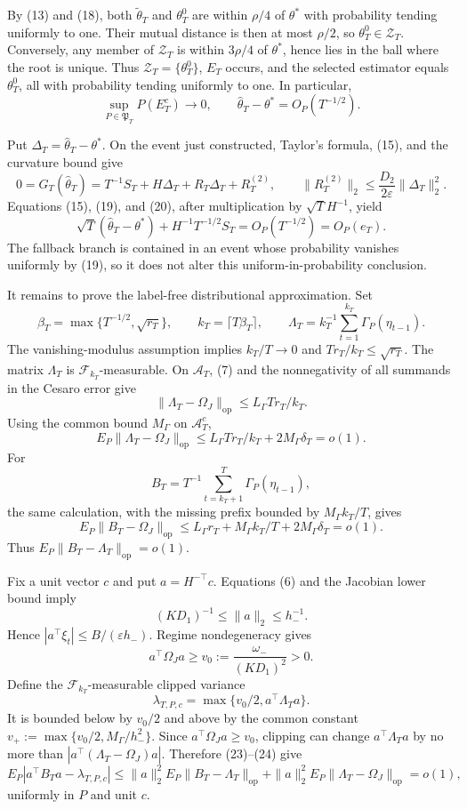 By (13) and (18), both \(\widetilde\theta_T\) and \(\theta_T^0\) are within \(\rho/4\) of \(\theta^*\) with probability tending uniformly to one. Their mutual distance is then at most \(\rho/2\), so \(\theta_T^0\in\mathcal Z_T\). Conversely, any member of \(\mathcal Z_T\) is within \(3\rho/4\) of \(\theta^*\), hence lies in the ball where the root is unique. Thus \(\mathcal Z_T=\{\theta_T^0\}\), \(E_T\) occurs, and the selected estimator equals \(\theta_T^0\), all with probability tending uniformly to one. In particular,
\[
 \sup_{P\in\mathfrak P_T}P(E_T^c)\longrightarrow0,
 \qquad \widehat\theta_T-\theta^*=O_P(T^{-1/2}). \tag{19}
\]

Put \(\Delta_T=\widehat\theta_T-\theta^*\). On the event just constructed, Taylor's formula, (15), and the curvature bound give
\[
 0=G_T(\widehat\theta_T)
 =T^{-1}S_T+H\Delta_T+R_T\Delta_T+R_T^{(2)},
 \qquad
 \|R_T^{(2)}\|_2\le\frac{D_2}{2\varepsilon}\|\Delta_T\|_2^2. \tag{20}
\]
Equations (15), (19), and (20), after multiplication by \(\sqrt T H^{-1}\), yield
\[
 \sqrt T(\widehat\theta_T-\theta^*)+H^{-1}T^{-1/2}S_T
 =O_P(T^{-1/2})=O_P(e_T). \tag{21}
\]
The fallback branch is contained in an event whose probability vanishes uniformly by (19), so it does not alter this uniform-in-probability conclusion.

It remains to prove the label-free distributional approximation. Set
\[
 \beta_T=\max\{T^{-1/2},\sqrt{r_T}\},
 \qquad k_T=\lceil T\beta_T\rceil,
 \qquad
 \Lambda_T=k_T^{-1}\sum_{t=1}^{k_T}\Gamma_P(\eta_{t-1}). \tag{22}
\]
The vanishing-modulus assumption implies \(k_T/T\to0\) and \(Tr_T/k_T\le\sqrt{r_T}\). The matrix \(\Lambda_T\) is \(\mathcal F_{k_T}\)-measurable. On \(\mathcal A_T\), (7) and the nonnegativity of all summands in the Cesaro error give
\[
 \|\Lambda_T-\Omega_J\|_{\mathrm{op}}
 \le L_\Gamma Tr_T/k_T.
\]
Using the common bound \(M_\Gamma\) on \(\mathcal A_T^c\),
\[
 E_P\|\Lambda_T-\Omega_J\|_{\mathrm{op}}
 \le L_\Gamma Tr_T/k_T+2M_\Gamma\delta_T=o(1). \tag{23}
\]
For
\[
 B_T=T^{-1}\sum_{t=k_T+1}^T\Gamma_P(\eta_{t-1}),
\]
the same calculation, with the missing prefix bounded by \(M_\Gamma k_T/T\), gives
\[
 E_P\|B_T-\Omega_J\|_{\mathrm{op}}
 \le L_\Gamma r_T+M_\Gamma k_T/T+2M_\Gamma\delta_T=o(1). \tag{24}
\]
Thus \(E_P\|B_T-\Lambda_T\|_{\mathrm{op}}=o(1)\).

Fix a unit vector \(c\) and put \(a=H^{-\top}c\). Equations (6) and the Jacobian lower bound imply
\[
 (KD_1)^{-1}\le\|a\|_2\le h_-^{-1}. \tag{25}
\]
Hence \(|a^\top\xi_t|\le B/(\varepsilon h_-)\). Regime nondegeneracy gives
\[
 a^\top\Omega_Ja\ge v_0:=\frac{\omega_-}{(KD_1)^2}>0. \tag{26}
\]
Define the \(\mathcal F_{k_T}\)-measurable clipped variance
\[
 \lambda_{T,P,c}=\max\{v_0/2,a^\top\Lambda_Ta\}. \tag{27}
\]
It is bounded below by \(v_0/2\) and above by the common constant \(v_+:=\max\{v_0/2,M_\Gamma/h_-^2\}\). Since \(a^\top\Omega_Ja\ge v_0\), clipping can change \(a^\top\Lambda_Ta\) by no more than \(|a^\top(\Lambda_T-\Omega_J)a|\). Therefore (23)--(24) give
\[
 E_P|a^\top B_Ta-\lambda_{T,P,c}|
 \le \|a\|_2^2E_P\|B_T-\Lambda_T\|_{\mathrm{op}}
 +\|a\|_2^2E_P\|\Lambda_T-\Omega_J\|_{\mathrm{op}}
 =o(1), \tag{28}
\]
uniformly in \(P\) and unit \(c\).

